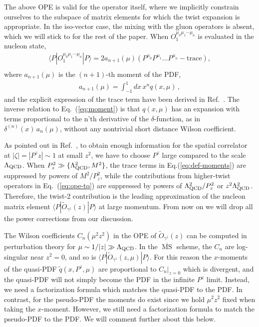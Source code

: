 \documentclass[prd,aps,twocolumn,preprintnumbers,showpacs,nofootinbib,superscriptaddress,notitlepage]{revtex4-1}
\newcommand{\beq}{\begin{eqnarray}}
\newcommand{\eeq}{\end{eqnarray}}
\newcommand{\nn}{\nonumber}
\DeclareRobustCommand{\eq}[1]{Eq.~(\ref{eq:#1})}
\begin{document}
The above OPE is valid for the operator itself, where we implicitly  constrain ourselves to the subspace of matrix elements for which the twist expansion is appropriate. In the iso-vector case, the mixing with the gluon operators is absent, which we will stick to for the rest of the paper. When $O_1^{\mu_0\mu_1\cdots\mu_n}$ is evaluated in the nucleon state,
\beq \label{eq:def-moments}
\langle P | O_1^{{\mu}_0 {\mu}_1 \cdots {\mu}_n} | P\rangle =  2a_{n + 1}(\mu)\left(P^{{\mu}_0} P^{{\mu}_1} \ldots P^{{\mu}_n} - \text{trace}\right),  \nn\\
\eeq
where $a_{n+1}(\mu)$ is the $(n+1)$-th moment of the PDF,
\beq \label{eq:moment}
a_{n + 1} \left(\mu\right)=\int_{-1}^1 dx\,x^n q \left(x,\mu\right)\,,
\eeq
and the explicit expression of the trace term have been derived in Ref.~\cite{Nachtmann:1973mr,Georgi:1976ve,Chen:2016utp}. The inverse relation to \eq{moment} is that $q(x,\mu)$ has an expansion with terms proportional to the n'th derivative of the $\delta$-function, as in $\delta^{(n)}(x)\, a_n(\mu)$,  without any nontrivial short distance Wilson coefficient.

As pointed out in Ref.~\cite{Ji:2017rah}, to obtain enough information for the spatial correlator at $|\zeta|= |P^z z|\sim 1$ at small $z^2$, we have to choose $P^z$ large compared to the scale $\Lambda_{\rm QCD}$. When $P_z^2\gg\{\Lambda_{\rm QCD}^2, M^2\}$, the trace terms in Eq.(\ref{eq:def-moments}) are suppressed by powers of $M^2/P_z^2$, while the contributions from higher-twist operators in Eq.~(\ref{eq:ope-tq}) are suppressed by powers of $\Lambda_{\rm QCD}^2/P_z^2$ or $z^2\Lambda_{\rm QCD}^2$. Therefore, the twist-2 contribution is the leading approximation of the nucleon matrix element $\langle P|\tilde{O}_{\gamma^z}(z)|P\rangle$ at large momentum. From now on we will drop all the power corrections from our discussion.


The Wilson coefficients $C_n ({\mu}^2 z^2)$ in the OPE of $\tilde{O}_{\gamma^z}(z)$ can be computed in perturbation theory for $\mu\sim 1/|z|\gg \Lambda_{\rm QCD}$. In
the $\overline{\ensuremath{\operatorname{MS}}}$ scheme, the $C_n$ are log-singular near $z^2 =
0$, and so is $\langle P|\tilde{O}_{\gamma^z}(z,\mu)|P\rangle$. For this reason the $x$-moments of the quasi-PDF $\tilde q(x,P^z,\mu)$ are proportional to $C_n|_{z=0}$ which is
divergent, and the quasi-PDF will not simply become the PDF in the infinite $P^z$ limit. Instead, we need a factorization formula which matches the quasi-PDF to the PDF. In contrast, for the pseudo-PDF the moments do exist since we hold $\mu^2 z^2$ fixed when taking the $x$-moment. However, we still need a factorization formula to match the pseudo-PDF to the PDF.  We will comment further about this below.
\end{document}
